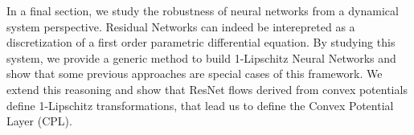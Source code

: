 In a final section, we study the robustness of neural networks from a dynamical system perspective. Residual Networks can indeed be interepreted as a discretization of a first order parametric differential equation. By studying this system, we provide a generic method to build 1-Lipschitz Neural Networks and show that some previous approaches are special cases of this framework. We extend this reasoning and show that ResNet flows derived from convex potentials define 1-Lipschitz transformations, that lead us to define the Convex Potential Layer (CPL). 

